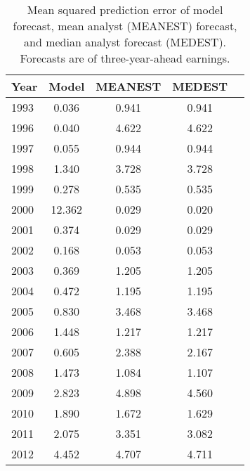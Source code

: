 \begin{table}[H]
\centering
\begin{tabular}{lcccc}
  \hline
Year & Model & MEANEST & MEDEST \\ 
  \hline
1993 & 0.036 & 0.941 & 0.941 \\ 
1996 & 0.040 & 4.622 & 4.622 \\ 
1997 & 0.055 & 0.944 & 0.944 \\ 
1998 & 1.340 & 3.728 & 3.728 \\ 
1999 & 0.278 & 0.535 & 0.535 \\ 
2000 & 12.362 & 0.029 & 0.020 \\ 
2001 & 0.374 & 0.029 & 0.029 \\ 
2002 & 0.168 & 0.053 & 0.053 \\ 
2003 & 0.369 & 1.205 & 1.205 \\ 
2004 & 0.472 & 1.195 & 1.195 \\ 
2005 & 0.830 & 3.468 & 3.468 \\ 
2006 & 1.448 & 1.217 & 1.217 \\ 
2007 & 0.605 & 2.388 & 2.167 \\ 
2008 & 1.473 & 1.084 & 1.107 \\ 
2009 & 2.823 & 4.898 & 4.560 \\ 
2010 & 1.890 & 1.672 & 1.629 \\ 
2011 & 2.075 & 3.351 & 3.082 \\ 
2012 & 4.452 & 4.707 & 4.711 \\ 
   \hline
\end{tabular}
\captionsetup{width=5.5in, font=footnotesize}
\caption{Mean squared prediction error of model forecast, mean analyst (MEANEST) forecast, and 
median analyst forecast (MEDEST). Forecasts are of three-year-ahead earnings.} 
\label{spe-by-year-table-fy3}
\end{table}
